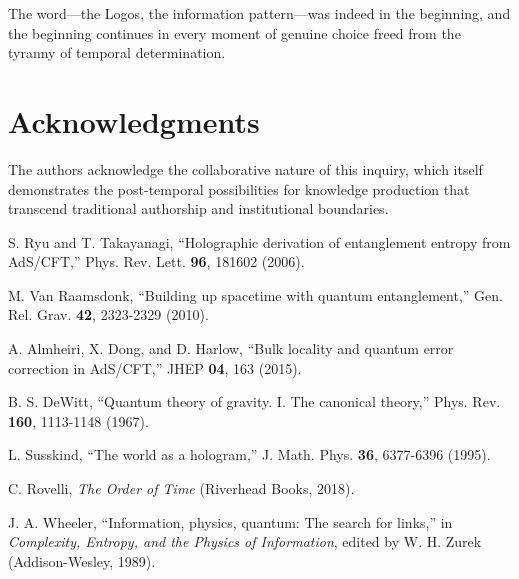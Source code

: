 \documentclass[12pt]{article}
\begin{document}
The word—the Logos, the information pattern—was indeed in the beginning, and the beginning continues in every moment of genuine choice freed from the tyranny of temporal determination.

\section*{Acknowledgments}

The authors acknowledge the collaborative nature of this inquiry, which itself demonstrates the post-temporal possibilities for knowledge production that transcend traditional authorship and institutional boundaries.

\begin{thebibliography}{99}

S. Ryu and T. Takayanagi, ``Holographic derivation of entanglement entropy from AdS/CFT,'' Phys. Rev. Lett. \textbf{96}, 181602 (2006).

M. Van Raamsdonk, ``Building up spacetime with quantum entanglement,'' Gen. Rel. Grav. \textbf{42}, 2323-2329 (2010).

A. Almheiri, X. Dong, and D. Harlow, ``Bulk locality and quantum error correction in AdS/CFT,'' JHEP \textbf{04}, 163 (2015).

B. S. DeWitt, ``Quantum theory of gravity. I. The canonical theory,'' Phys. Rev. \textbf{160}, 1113-1148 (1967).

L. Susskind, ``The world as a hologram,'' J. Math. Phys. \textbf{36}, 6377-6396 (1995).

C. Rovelli, \emph{The Order of Time} (Riverhead Books, 2018).

J. A. Wheeler, ``Information, physics, quantum: The search for links,'' in \emph{Complexity, Entropy, and the Physics of Information}, edited by W. H. Zurek (Addison-Wesley, 1989).

\end{thebibliography}
\end{document}
